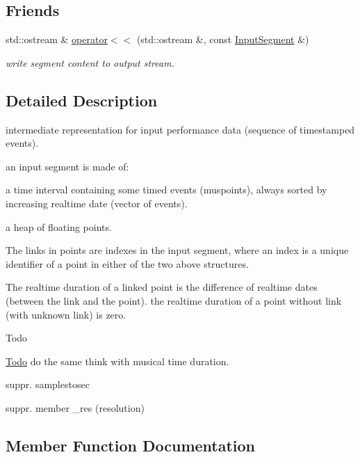 \subsection*{Friends}
\begin{DoxyCompactItemize}
\item 
\mbox{\label{classInputSegment_ad79274ec4d86002559d8542afb80e5a7}} 
std\+::ostream \& \mbox{\hyperlink{classInputSegment_ad79274ec4d86002559d8542afb80e5a7}{operator$<$$<$}} (std\+::ostream \&, const \mbox{\hyperlink{classInputSegment}{Input\+Segment}} \&)
\begin{DoxyCompactList}\small\item\em write segment content to output stream. \end{DoxyCompactList}\end{DoxyCompactItemize}


\subsection{Detailed Description}
intermediate representation for input performance data (sequence of timestamped events). 

an input segment is made of\+:
\begin{DoxyItemize}
\item a time interval containing some timed events (muspoints), always sorted by increasing realtime date (vector of events).
\item a heap of floating points.
\end{DoxyItemize}

The links in points are indexes in the input segment, where an index is a unique identifier of a point in either of the two above structures.

The realtime duration of a linked point is the difference of realtime dates (between the link and the point). the realtime duration of a point without link (with unknown link) is zero.

\begin{DoxyRefDesc}{Todo}
\item[\mbox{\hyperlink{todo__todo000022}{Todo}}]do the same think with musical time duration. 

suppr. samplestosec 

suppr. member \+\_\+res (resolution) \end{DoxyRefDesc}


\subsection{Member Function Documentation}
\mbox{\label{classInputSegment_aa5410aeef3d5c6a263424b252eb78511}} 
